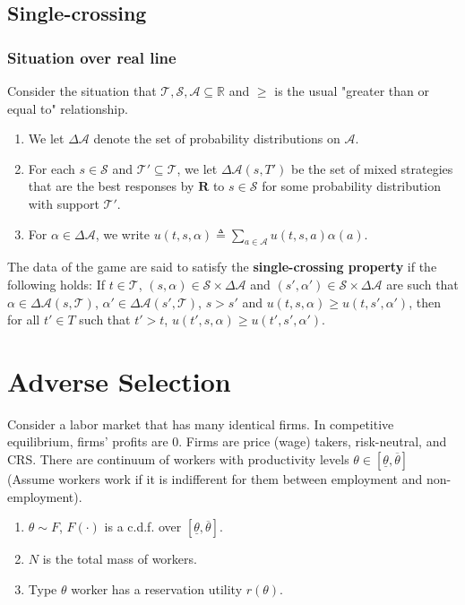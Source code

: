 \documentclass[11pt]{elegantbook}
\begin{document}
\subsection{Single-crossing}

\subsubsection{Situation over real line}
Consider the situation that $\mathcal{T},\mathcal{S},\mathcal{A}\subseteq \mathbb{R}$ and $\geq$ is the usual "greater than or equal to" relationship.

\begin{enumerate}
    \item We let $\Delta \mathcal{A}$ denote the set of probability distributions on $\mathcal{A}$.
    \item For each $s\in \mathcal{S}$ and $\mathcal{T}'\subseteq \mathcal{T}$, we let $\Delta\mathcal{A}(s,T')$ be the set of mixed strategies that are the best responses by $\mathbf{R}$ to $s\in \mathcal{S}$ for some probability distribution with support $\mathcal{T}'$.
    \item For $\alpha\in \Delta\mathcal{A}$, we write $u(t,s,\alpha)\triangleq \sum_{a\in \mathcal{A}}u(t,s,a)\alpha(a)$.
\end{enumerate}

\begin{definition}
    \normalfont
    The data of the game are said to satisfy the \textbf{single-crossing property} if the following holds: If $t\in \mathcal{T}$, $(s,\alpha)\in \mathcal{S}\times \Delta\mathcal{A}$ and $(s',\alpha')\in \mathcal{S}\times \Delta\mathcal{A}$ are such that $\alpha\in \Delta\mathcal{A}(s,\mathcal{T})$, $\alpha'\in \Delta\mathcal{A}(s',\mathcal{T})$, $s>s'$ and $u(t,s,\alpha)\geq u(t,s',\alpha')$, then for all $t'\in T$ such that $t'>t$, $u(t',s,\alpha)\geq u(t',s',\alpha')$.
\end{definition}

\section{Adverse Selection}
Consider a labor market that has many identical firms. In competitive equilibrium, firms' profits are $0$. Firms are price (wage) takers, risk-neutral, and CRS. There are continuum of workers with productivity levels $\theta\in\left[\underline{\theta},\overline{\theta}\right]$ (Assume workers work if it is indifferent for them between employment and non-employment).
\begin{enumerate}
    \item $\theta\sim F$, $F(\cdot)$ is a c.d.f. over $\left[\underline{\theta},\overline{\theta}\right]$.
    \item $N$ is the total mass of workers.
    \item Type $\theta$ worker has a reservation utility $r(\theta)$.
\end{enumerate}
\end{document}
